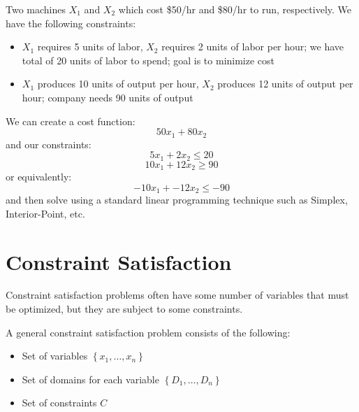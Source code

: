 \begin{problem}
	Two machines \(X_1\) and \(X_2\) which cost \$50/hr and \$80/hr to run, respectively. We have the following constraints:
	\begin{itemize}
		\item \(X_1\) requires 5 units of labor, \(X_2\) requires 2 units of labor per hour; we have total of 20 units of labor to spend; goal is to minimize cost
		\item \(X_1\) produces 10 units of output per hour, \(X_2\) produces 12 units of output per hour; company needs 90 units of output
	\end{itemize}
\end{problem}
\begin{answer}
	We can create a cost function:
	\[
		50x_1 + 80x_2
	\]
	and our constraints:
	\[
		5x_1 + 2x_2 \leq 20
	\]
	\[
		10x_1 + 12x_2 \geq 90
	\]
	or equivalently:
	\[
		-10x_1 + -12x_2 \leq -90
	\]
	and then solve using a standard linear programming technique such as Simplex, Interior-Point, etc.
\end{answer}

\section{Constraint Satisfaction}
Constraint satisfaction problems often have some number of variables that must be optimized, but they are subject to some constraints.

\begin{definition}
	A general constraint satisfaction problem consists of the following:
	\begin{itemize}
		\item Set of variables \(\left\{ x_1, \ldots , x_n \right\} \) 
		\item Set of domains for each variable \(\left\{ D_1, \ldots , D_n \right\} \) 
		\item Set of constraints \(C\) 
	\end{itemize}
\end{definition}

